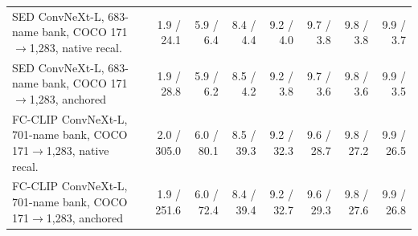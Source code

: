 \begin{tabular}{@{}lrrrrrrr@{}}
SED ConvNeXt-L, 683-name bank, COCO 171$\to$1,283, native recal. & 1.9 / 24.1 & 5.9 / 6.4 & 8.4 / 4.4 & 9.2 / 4.0 & 9.7 / 3.8 & 9.8 / 3.8 & 9.9 / 3.7 \\
SED ConvNeXt-L, 683-name bank, COCO 171$\to$1,283, anchored & 1.9 / 28.8 & 5.9 / 6.2 & 8.5 / 4.2 & 9.2 / 3.8 & 9.7 / 3.6 & 9.8 / 3.6 & 9.9 / 3.5 \\
FC-CLIP ConvNeXt-L, 701-name bank, COCO 171$\to$1,283, native recal. & 2.0 / 305.0 & 6.0 / 80.1 & 8.5 / 39.3 & 9.2 / 32.3 & 9.6 / 28.7 & 9.8 / 27.2 & 9.9 / 26.5 \\
FC-CLIP ConvNeXt-L, 701-name bank, COCO 171$\to$1,283, anchored & 1.9 / 251.6 & 6.0 / 72.4 & 8.4 / 39.4 & 9.2 / 32.7 & 9.6 / 29.3 & 9.8 / 27.6 & 9.9 / 26.8 \\
\bottomrule
\end{tabular}
